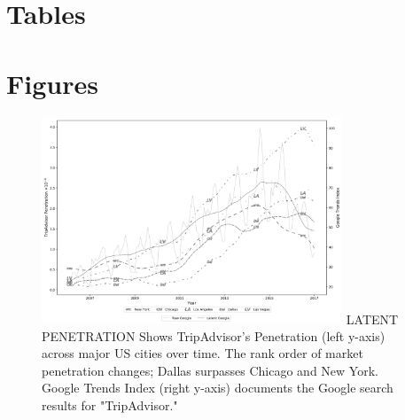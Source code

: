 \documentclass{informs_mod} %
\begin{document}
\section*{Tables}\label{sec:tab}


\clearpage


\clearpage


\clearpage


\clearpage


\clearpage


\clearpage

\section*{Figures} \label{sec:fig}

\begin{figure}[htp]
\FIGURE
{\includegraphics[width=0.8\textwidth,height=\textheight,keepaspectratio]{./Figures/TA_Penetration.png}}
{LATENT PENETRATION\label{fig:latentpen}}
{Shows TripAdvisor's Penetration (left y-axis) across major US cities over time. The rank order of market penetration changes; Dallas surpasses Chicago and New York. Google Trends Index (right y-axis) documents the Google search results for "TripAdvisor."}
\end{figure}
\clearpage
\end{document}
